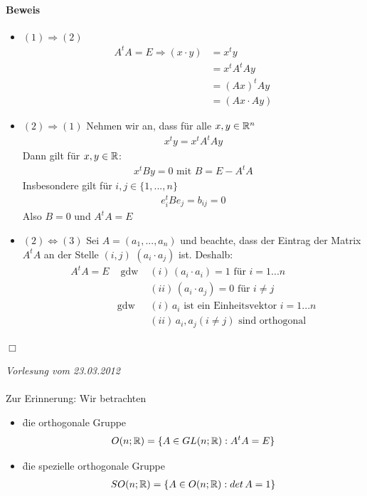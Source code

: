 \paragraph{Beweis}
\begin{itemize}
\item $(1) \Rightarrow (2)$ 
\begin{align}
A^t A = E \Rightarrow (x \cdot y) &= x^t y \\
&= x^t A^t Ay \\
&= (Ax)^t Ay \\
&= (Ax\cdot Ay)
\end{align}

\item $(2) \Rightarrow (1)$ Nehmen wir an, dass für alle $x, y \in \mathbb{R}^n$
\begin{align}
x^t y = x^t A^t Ay
\end{align}
Dann gilt für $x, y \in \mathbb{R}$:
\begin{align}
x^t By = 0 \text{ mit } B = E - A^t A
\end{align}
Insbesondere gilt für $i, j \in \{1, ..., n\}$
\begin{align}
e_i^t B e_j = b_{ij} = 0
\end{align}
Also $B= 0$ und $A^t A = E$

\item $(2) \Leftrightarrow (3)$ Sei $A = (a_1, ..., a_n)$ und beachte, dass der Eintrag der Matrix $A^t A$ an der Stelle $(i, j)$ $(a_i \cdot a_j)$ ist. Deshalb:
\begin{align}
A^t A = E &\text{ gdw } &(i)\, (a_i \cdot a_i) = 1 \text{ für } i = 1...n \\
& &(ii)\, (a_i \cdot a_j) = 0 \text{ für } i \neq j \\
&\text{gdw } &(i)\, a_i  \text{ ist ein Einheitsvektor } i= 1...n \\
& &(ii)\, a_i, a_j (i \neq j) \text{ sind orthogonal}
\end{align}
\end{itemize}
\hfill $\Box$

\newpage
\noindent \textit{Vorlesung vom 23.03.2012} \\\\
Zur Erinnerung: Wir betrachten
\begin{itemize}
\item \f{die orthogonale Gruppe}
\begin{align}
O(n; \mathbb{R}) = \{A \in GL(n; \mathbb{R}): A^t A = E\}
\end{align}
\item \f{die spezielle orthogonale Gruppe}
\begin{align}
SO(n; \mathbb{R}) = \{A \in O(n; \mathbb{R}): det\, A = 1\}
\end{align}
\end{itemize}

